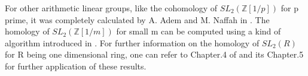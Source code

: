 \begin{remark}
For other arithmetic linear groups, like the cohomology of $SL_2(\mathbb{Z}[1/p])$ for p prime, it was completely calculated by A. Adem and M. Naffah in \cite{adem1998cohomology}. The homology of $SL_2(\mathbb{Z}[1/m])$ for small m can be computed using a kind of algorithm introduced in \cite{bui2014homology}. For further information on the homology of $SL_2(R)$ for R being one dimensional ring, one can refer to Chapter.4 of \cite{knudson2012homology} and its Chapter.5 for further application of these results.
\end{remark}

